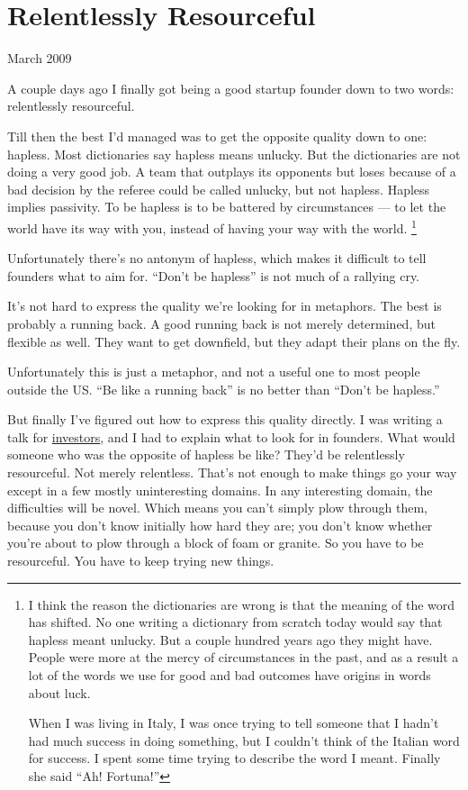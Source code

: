 \chapter{Relentlessly Resourceful}

March 2009

A couple days ago I finally got being a good startup founder down to two
words: relentlessly resourceful.

Till then the best I'd managed was to get the opposite quality down to
one: hapless. Most dictionaries say hapless means unlucky. But the
dictionaries are not doing a very good job. A team that outplays its
opponents but loses because of a bad decision by the referee could be
called unlucky, but not hapless. Hapless implies passivity. To be
hapless is to be battered by circumstances --- to let the world have its
way with you, instead of having your way with the world.
\footnote{I think the reason the dictionaries are wrong is that the
meaning of the word has shifted. No one writing a dictionary from
scratch today would say that hapless meant unlucky. But a couple hundred
years ago they might have. People were more at the mercy of
circumstances in the past, and as a result a lot of the words we use for
good and bad outcomes have origins in words about luck.

When I was living in Italy, I was once trying to tell someone that I
hadn't had much success in doing something, but I couldn't think of the
Italian word for success. I spent some time trying to describe the word
I meant. Finally she said ``Ah! Fortuna!''}

Unfortunately there's no antonym of hapless, which makes it difficult to
tell founders what to aim for. ``Don't be hapless'' is not much of a
rallying cry.

It's not hard to express the quality we're looking for in metaphors. The
best is probably a running back. A good running back is not merely
determined, but flexible as well. They want to get downfield, but they
adapt their plans on the fly.

Unfortunately this is just a metaphor, and not a useful one to most
people outside the US. ``Be like a running back'' is no better than
``Don't be hapless.''

But finally I've figured out how to express this quality directly. I was
writing a talk for \href{angelinvesting.html}{investors}, and I had to
explain what to look for in founders. What would someone who was the
opposite of hapless be like? They'd be relentlessly resourceful. Not
merely relentless. That's not enough to make things go your way except
in a few mostly uninteresting domains. In any interesting domain, the
difficulties will be novel. Which means you can't simply plow through
them, because you don't know initially how hard they are; you don't know
whether you're about to plow through a block of foam or granite. So you
have to be resourceful. You have to keep trying new things.

